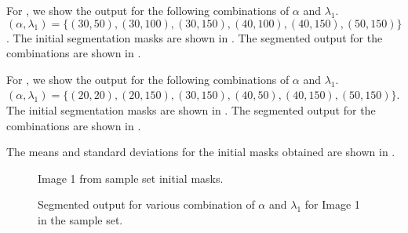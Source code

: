 \begin{definition}
For , we show the output for the following combinations of $\alpha$ and $\lambda_1$. $(\alpha,\lambda_1) = \{(30,50), (30,100), (30,150), (40,100), (40,150), (50,150)\}$. The initial segmentation masks are shown in . The segmented output for the combinations are shown in .

For , we show the output for the following combinations of $\alpha$ and $\lambda_1$. $(\alpha,\lambda_1) = \{(20,20), (20,150), (30,150), (40,50), (40,150), (50,150)\}$. The initial segmentation masks are shown in . The segmented output for the combinations are shown in .

The means and standard deviations for the initial masks obtained are shown in .

\clearpage

\begin{figure}[!t]
	\centering
	\caption{Image 1 from sample set  initial masks.}
	\label{fig:image1init}
\end{figure}

\begin{figure}[!t]
	\centering
	\caption{Segmented output for various combination of $\alpha$ and $\lambda_1$ for Image 1 in the sample set.}
	\label{fig:image1mytune}
\end{figure}


\end{definition}
